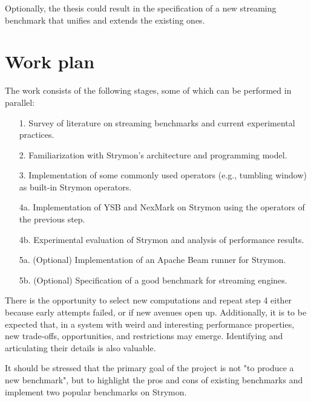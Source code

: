 \documentclass[a4paper,10pt,parskip=half]{scrartcl}
\begin{document}
Optionally, the thesis could result in the specification of a new streaming benchmark that unifies and extends the existing ones.\\

\printbibliography[heading=none]


\section{Work plan}

The work consists of the following stages, some of which can be performed in
parallel:

\begin{itemize}
  \item[1.] Survey of literature on streaming benchmarks and current experimental practices. 
 
  \item[2.] Familiarization with Strymon's architecture and programming model.

  \item[3.] Implementation of some commonly used operators (e.g., tumbling window) as built-in Strymon operators.

  \item[4a.] Implementation of YSB and NexMark on Strymon using the operators of the previous step.
  \item[4b.] Experimental evaluation of Strymon and analysis of performance results.

  \item[5a.] (Optional) Implementation of an Apache Beam runner for Strymon.
  \item[5b.] (Optional) Specification of a good benchmark for streaming engines.
  
\end{itemize}

There is the opportunity to select new computations and repeat step 4 either
because early attempts failed, or if new avenues open up.  Additionally, it is
to be expected that, in a system with weird and interesting performance
properties, new trade-offs, opportunities, and restrictions may emerge.
Identifying and articulating their details is also valuable.

It should be stressed that the primary goal of the project is not "to produce a
new benchmark", but to highlight the pros and cons of existing benchmarks and implement two popular benchmarks
on Strymon. 
\end{document}
